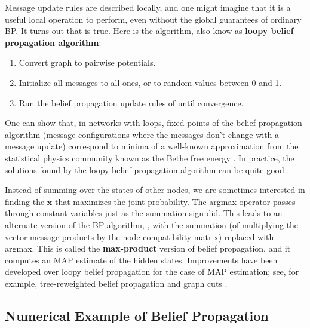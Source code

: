 Message update rules are described locally, and one might imagine that
it is a useful local operation to perform, even without the global
guarantees of ordinary BP.   It turns out that is true.   Here is the algorithm, also know as
{\bf loopy belief propagation algorithm}:
\begin{enumerate}
\item Convert graph to pairwise potentials.
\item Initialize all messages to all ones, or to random values
 between 0 and 1.
\item  Run the belief propagation update rules of
  \sect{\ref{sect:bpRules}} until convergence.
\end{enumerate}

One can show that, in networks with loops, fixed points of the
belief propagation algorithm (message configurations where the
messages don't change with a message update) correspond to minima of a
well-known approximation from the statistical physics community known 
as the Bethe free energy \cite{Yedidia00b}.  In practice, the solutions found by the loopy belief propagation algorithm can be quite good \cite{Murphy1999}.



Instead of summing over the states of other nodes, we are sometimes
interested in finding the $\mathbf{x}$ that maximizes the joint probability.  The argmax
operator passes through constant variables just as the summation sign
did.  This leads to an alternate version of the BP
algorithm, \eqn{\ref{eq:bpupdate}}, with the summation (of multiplying the vector message products by the node compatibility matrix) replaced with argmax.  This is
called the {\bf max-product} 
version of belief propagation, and it
computes an MAP estimate of the hidden states.   
Improvements have been developed over loopy belief propagation for the
case of MAP estimation; see, for example, tree-reweighted belief propagation \cite{Kolmogorov2006} and graph cuts \cite{Zabih2004}.


\subsection{Numerical Example of Belief Propagation}
\label{sect:numerical}

